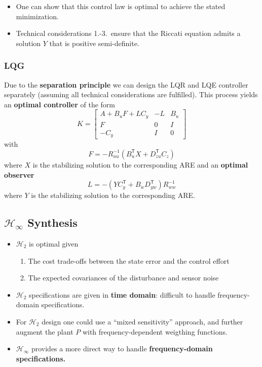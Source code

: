
\begin{itemize}
    \item One can show that this control law is optimal to achieve the stated minimization.
    \item Technical considerations 1.-3.\ ensure that the Riccati equation admits a solution $Y$ that is positive semi-definite.
\end{itemize}

\subsubsection{LQG}
Due to the \textbf{separation principle} we can design the LQR and LQE controller separately (assuming all technical considerations are fulfilled). This process yields an \textbf{optimal controller} of the form
\begin{equation*}
    K=\left[\begin{array}{c|cc}%
            A+B_u F+LC_y & -L & B_u \\
            \hline  %
            F            & 0  & I   \\
            -C_y         & I  & 0
        \end{array}\right]
\end{equation*}
with
\begin{equation*}
    F=-R_{uu}^{-1}(B_{u}^{\mathsf{T}}X+D_{zu}^{\mathsf{T}}C_{z})
\end{equation*}
where $X$ is the stabilizing solution to the corresponding ARE and an \textbf{optimal observer}
\begin{equation*}
    L=-(YC_y^{\mathsf{T}}+B_w D_{yw}^{\mathsf{T}})R_{ww}^{-1}
\end{equation*}
where $Y$ is the stabilizing solution to the corresponding ARE.

\subsection{\texorpdfstring{$\mathcal{H}_\infty$}{H-infinity} Synthesis}
\begin{itemize}
    \item $\mathcal{H}_2$ is optimal given
          \begin{enumerate}
              \item The cost trade-offs between the state error and the control effort
              \item The expected covariances of the disturbance and sensor noise
          \end{enumerate}
    \item $\mathcal{H}_2$ specifications are given in \textbf{time domain}: difficult to handle frequency-domain specifications.
    \item For $\mathcal{H}_2$ design one could use a ``mixed sensitivity'' approach, and further augment the plant $P$ with frequency-dependent weigthing functions.
    \item $\mathcal{H}_\infty$ provides a more direct way to handle \textbf{frequency-domain specifications.}
\end{itemize}

